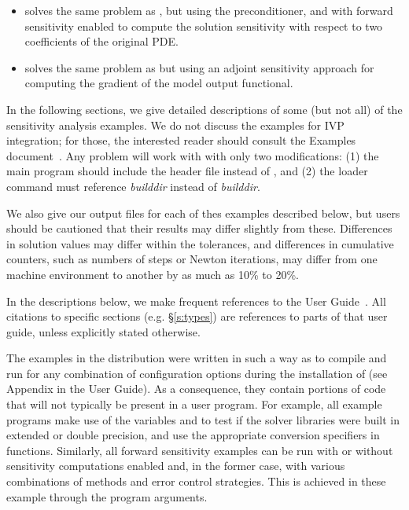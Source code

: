 \begin{itemize}
\item {}
  solves the same problem as , but using the {\idabbdpre}
  preconditioner, and with forward sensitivity enabled to compute the solution
  sensitivity with respect to two coefficients of the original PDE.
  

\item {}
  solves the same problem as  but using an adjoint
  sensitivity approach for computing the gradient of the model output functional.

\end{itemize}


\vspace{0.2in}\noindent
In the following sections, we give detailed descriptions of some (but
not all) of the sensitivity analysis examples. We do not discuss the 
examples for IVP integration; for those, the interested reader should consult
the {\ida} Examples document~\cite{ida_ex}. Any {\ida} problem
will work with {\idas} with only two modifications: (1) the main program
should include the header file  instead of , and
(2) the loader command must reference
{\em builddir} instead of
{\em builddir}.

We also give our output files for each of thes examples described below,
but users should be cautioned that their results may differ slightly from these.
Differences in solution values may differ within the tolerances, and differences
in cumulative counters, such as numbers of steps or Newton iterations, may differ
from one machine environment to another by as much as 10\% to 20\%.

In the descriptions below, we make frequent references to the {\idas}
User Guide~\cite{idas_ug}.  All citations to specific sections
(e.g. \S\ref{s:types}) are references to parts of that user guide, unless
explicitly stated otherwise.

\vspace{0.2in}
The examples in the {\idas} distribution were written in such a way as
to compile and run for any combination of configuration options during
the installation of {\sundials} (see Appendix  in the User Guide).
As a consequence, they contain portions of code that will not typically be present in a
user program. For example, all example programs make use of the
variables  and 
to test if the solver libraries
were built in extended or double precision, and use the appropriate conversion 
specifiers in  functions. Similarly, all forward sensitivity
examples can be run with or without sensitivity computations enabled and,
in the former case, with various combinations of methods and error control 
strategies. This is achieved in these example through the program arguments.

